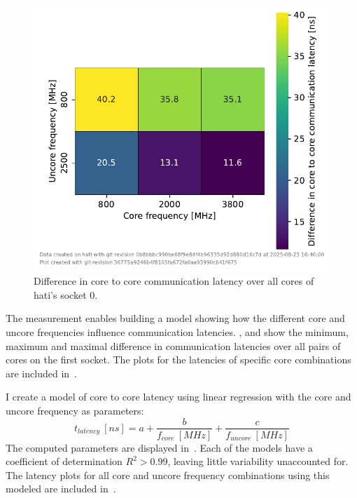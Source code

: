 \begin{figure}[]
    \centering
    \includegraphics[width=0.8\columnwidth]{fig/core-to-core-latency/all-to-all-heatmap-diff.pdf}
    \caption{\label{fig:cbo-latencies-socket-diff}Difference in core to core communication latency over all cores of hati's socket 0.}
\end{figure}

The measurement enables building a model showing how the different core and uncore frequencies influence communication latencies.
,  and  show the minimum, maximum and maximal difference in communication latencies over all pairs of cores on the first socket.
The plots for the latencies of specific core combinations are included in~.

I create a model of core to core latency using linear regression with the core and uncore frequency as parameters:
\begin{equation*}
t_{latency}~[ns] = a + \frac{b}{f_{core}~[MHz]} + \frac{c}{f_{uncore}~[MHz]}
\end{equation*}
The computed parameters are displayed in~.
Each of the models have a coefficient of determination $R^2 > 0.99$, leaving little variability unaccounted for.
The latency plots for all core and uncore frequency combinations using this modeled are included in~.


